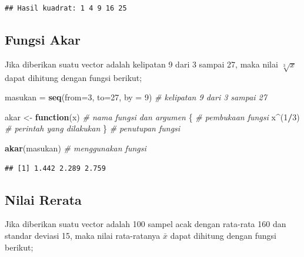 \documentclass[
]{book}
\newenvironment{Shaded}{\begin{snugshade}}{\end{snugshade}}
\newcommand{\AttributeTok}[1]{\textcolor[rgb]{0.13,0.29,0.53}{#1}}
\newcommand{\CommentTok}[1]{\textcolor[rgb]{0.56,0.35,0.01}{\textit{#1}}}
\newcommand{\ControlFlowTok}[1]{\textcolor[rgb]{0.13,0.29,0.53}{\textbf{#1}}}
\newcommand{\DecValTok}[1]{\textcolor[rgb]{0.00,0.00,0.81}{#1}}
\newcommand{\FunctionTok}[1]{\textcolor[rgb]{0.13,0.29,0.53}{\textbf{#1}}}
\newcommand{\NormalTok}[1]{#1}
\newcommand{\OtherTok}[1]{\textcolor[rgb]{0.56,0.35,0.01}{#1}}
\newcommand{\SpecialCharTok}[1]{\textcolor[rgb]{0.81,0.36,0.00}{\textbf{#1}}}
\begin{document}
\begin{verbatim}
## Hasil kuadrat: 1 4 9 16 25
\end{verbatim}

\hypertarget{fungsi-akar}{%
\subsection{Fungsi Akar}\label{fungsi-akar}}

Jika diberikan suatu vector adalah kelipatan 9 dari 3 sampai 27, maka nilai \(\sqrt[3]{x}\) dapat dihitung dengan fungsi berikut;

\begin{Shaded}
\begin{Highlighting}[]
\NormalTok{masukan }\OtherTok{=} \FunctionTok{seq}\NormalTok{(}\AttributeTok{from=}\DecValTok{3}\NormalTok{, }\AttributeTok{to=}\DecValTok{27}\NormalTok{, }\AttributeTok{by =} \DecValTok{9}\NormalTok{)         }\CommentTok{\# kelipatan 9 dari 3 sampai 27}

\NormalTok{akar }\OtherTok{\textless{}{-}} \ControlFlowTok{function}\NormalTok{(x)                          }\CommentTok{\# nama fungsi dan argumen}
\NormalTok{   \{                                         }\CommentTok{\# pembukaan fungsi}
\NormalTok{    x}\SpecialCharTok{\^{}}\NormalTok{(}\DecValTok{1}\SpecialCharTok{/}\DecValTok{3}\NormalTok{)                                  }\CommentTok{\# perintah yang dilakukan }
\NormalTok{   \}                                         }\CommentTok{\# penutupan fungsi}

\FunctionTok{akar}\NormalTok{(masukan)                                }\CommentTok{\# menggunakan fungsi}
\end{Highlighting}
\end{Shaded}

\begin{verbatim}
## [1] 1.442 2.289 2.759
\end{verbatim}

\hypertarget{nilai-rerata}{%
\subsection{Nilai Rerata}\label{nilai-rerata}}

Jika diberikan suatu vector adalah 100 sampel acak dengan rata-rata 160 dan standar deviasi 15, maka nilai rata-ratanya \(\bar{x}\) dapat dihitung dengan fungsi berikut;
\end{document}
